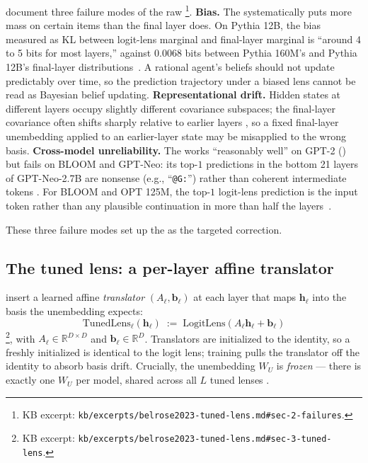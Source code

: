 \citet[\S 2]{belrose2023-tuned-lens} document three failure modes of
the raw \footnote{KB excerpt:
\texttt{kb/excerpts/belrose2023-tuned-lens.md\#sec-2-failures}.}.
\textbf{Bias.} The  systematically puts more mass on certain
 items than the final layer does. On Pythia 12B, the bias
measured as KL between logit-lens marginal and final-layer marginal is
``around 4 to 5 bits for most layers,'' against $0.0068$ bits between
Pythia 160M's and Pythia 12B's final-layer
distributions~\citep[\S 2]{belrose2023-tuned-lens}. A rational agent's
beliefs should not update predictably over time, so the prediction
trajectory under a biased lens cannot be read as Bayesian belief
updating. \textbf{Representational drift.} Hidden states at different
layers occupy slightly different covariance subspaces; the final-layer
covariance often shifts sharply relative to earlier layers
\citep[\S 3]{belrose2023-tuned-lens}, so a fixed final-layer unembedding
applied to an earlier-layer state may be misapplied to the wrong basis.
\textbf{Cross-model unreliability.} The  works ``reasonably
well'' on GPT-2 (\citealp{radford2019-gpt2}) but fails on BLOOM and
GPT-Neo: its top-$1$ predictions in the bottom 21 layers of GPT-Neo-2.7B
are nonsense (e.g., ``\texttt{@G:}'') rather than coherent intermediate
tokens \citep[\S 2 + Fig.~1]{belrose2023-tuned-lens}. For BLOOM and OPT
125M, the top-$1$ logit-lens prediction is the input token rather than
any plausible continuation in more than half the
layers~\citep[\S 2]{belrose2023-tuned-lens}.

These three failure modes set up the  as the targeted
correction.

\subsection{The tuned lens: a per-layer affine translator}
\label{sec:tuned-lens}

\citet[\S 3]{belrose2023-tuned-lens} insert a learned affine
\emph{translator} $(A_\ell, \mathbf{b}_\ell)$ at each layer that maps
$\mathbf{h}_\ell$ into the basis the unembedding expects:
\begin{equation}
  \boxed{\;\mathrm{TunedLens}_\ell(\mathbf{h}_\ell)
  \;:=\; \mathrm{LogitLens}(A_\ell \mathbf{h}_\ell + \mathbf{b}_\ell)\;}
  \label{eq:tuned-lens}
\end{equation}
\citep[\S 3, Eq.~8]{belrose2023-tuned-lens}\footnote{KB excerpt:
\texttt{kb/excerpts/belrose2023-tuned-lens.md\#sec-3-tuned-lens}.},
with $A_\ell \in \mathbb{R}^{D \times D}$ and
$\mathbf{b}_\ell \in \mathbb{R}^D$. Translators are initialized to the
identity, so a freshly initialized  is identical to the logit
lens; training pulls the translator off the identity to absorb basis
drift. Crucially, the unembedding $W_U$ is \emph{frozen} — there is
exactly one $W_U$ per model, shared across all $L$ tuned lenses
\citep[\S 3]{belrose2023-tuned-lens}.

